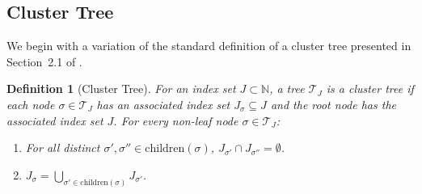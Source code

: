 \documentclass[final,3p,times]{elsarticle}
\newcommand{\mc}[1]{\mathcal{#1}}
\newtheorem{definition}{Definition}
\begin{document}
\subsection{Cluster Tree}\label{ssec:cluster_tree}
We begin with a variation of the standard definition of a cluster tree presented in Section~2.1 of \cite{borm2003introduction}.
\begin{definition}[Cluster Tree]\label{def:clustertree} 
    For an index set $J \subset \mathbb{N}$, a tree $\mc{T}_{J}$ is a \textit{cluster tree} if each node $\sigma \in \mc{T}_{J}$ has an associated index set $J_{\sigma} \subseteq J$ and the root node has the associated index set $J$. For every non-leaf node $\sigma \in \mc{T}_{J}$:
\begin{enumerate}
    \item For all distinct $\sigma', \sigma'' \in \text{children}(\sigma)$,  
           $J_{\sigma'} \cap J_{\sigma''} = \emptyset$.
    \item $J_{\sigma} = \bigcup_{\sigma' \in \text{children}(\sigma)} J_{\sigma'}$.
\end{enumerate}

\end{definition}
\end{document}

